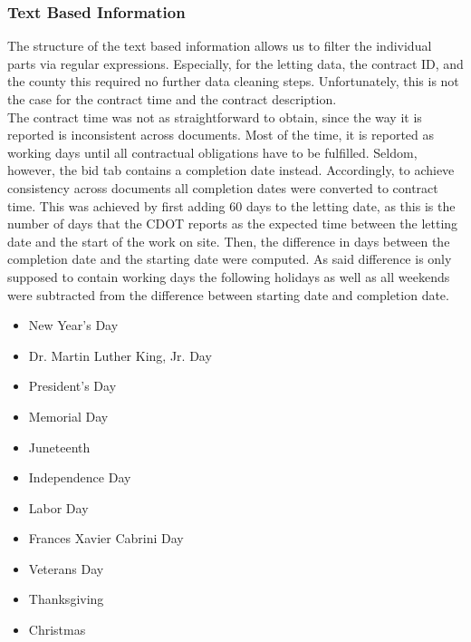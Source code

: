 \documentclass[a4paper,12pt, headsepline]{scrartcl}
\numberwithin{equation}{section}
\begin{document}
\subsubsection{Text Based Information}\label{subsubsec:descr}
 The structure of the text based information allows us to filter the individual parts via regular expressions. Especially, for the letting data, the contract ID, and the county this required no further data cleaning steps. Unfortunately, this is not the case for the contract time and the contract description.\\ 
 The contract time was not as straightforward to obtain, since the way it is reported is inconsistent across documents. Most of the time, it is reported as working days until all contractual obligations have to be fulfilled. Seldom, however, the bid tab contains a completion date instead. Accordingly, to achieve consistency across documents all completion dates were converted to contract time. This was achieved by first adding 60 days to the letting date, as this is the number of days that the CDOT reports as the expected time between the letting date and the start of the work on site. Then, the difference in days between the completion date and the starting date were computed. As said difference is only supposed to contain working days the following holidays as well as all weekends were subtracted from the difference between starting date and completion date.
 
 \begin{itemize}
 	\item New Year's Day
 	\item Dr. Martin Luther King, Jr. Day
 	\item President's Day
 	\item Memorial Day
 	\item Juneteenth
 	\item Independence Day
 	\item Labor Day
 	\item Frances Xavier Cabrini Day
 	\item Veterans Day
 	\item Thanksgiving
 	\item Christmas
 \end{itemize}
 
\end{document}
